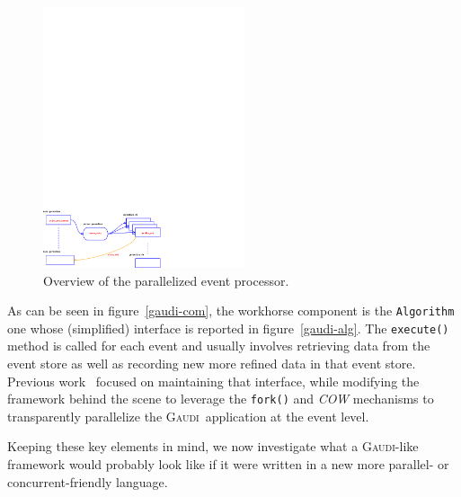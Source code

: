 \documentclass[a4paper]{jpconf}
\newcommand{\gaudi}{\textsc{Gaudi}}
\begin{document}
\begin{figure}[h]
\begin{center}
\begin{minipage}{15pc}
    \includegraphics[width=14pc]{figs/evtproc-diagram.pdf}
    \caption{\label{fig-mp-evt-loop}Overview of the parallelized event
      processor.}
  \end{minipage} 
\end{center}
\end{figure}

As can be seen in figure~\ref{gaudi-com}, the workhorse component is
the {\tt Algorithm} one whose (simplified) interface is reported in
figure~\ref{gaudi-alg}.
The {\tt execute()} method is called for each event and usually
involves retrieving data from the event store as well as recording new
more refined data in that event store.
Previous work~\cite{ref-athenamp} focused on maintaining that
interface, while modifying the framework behind the scene to leverage
the {\tt fork()} and \emph{COW} mechanisms to transparently
parallelize the \gaudi\ application at the event level.

Keeping these key elements in mind, we now investigate what a
\gaudi-like framework would probably look like if it were written in a
new more parallel- or concurrent-friendly language.
\end{document}
